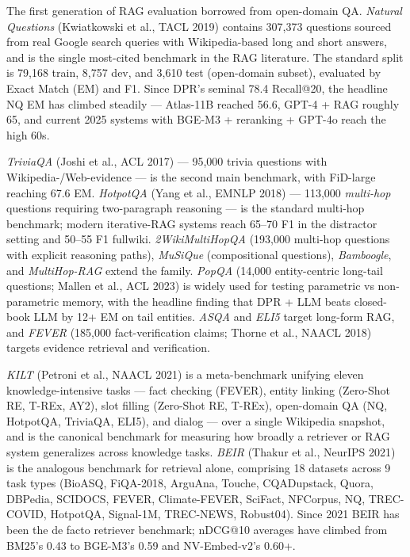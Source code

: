 The first generation of RAG evaluation borrowed from open-domain QA. \emph{Natural Questions} (Kwiatkowski et al., TACL 2019) contains 307,373 questions sourced from real Google search queries with Wikipedia-based long and short answers, and is the single most-cited benchmark in the RAG literature. The standard split is 79,168 train, 8,757 dev, and 3,610 test (open-domain subset), evaluated by Exact Match (EM) and F1. Since DPR's seminal 78.4 Recall@20, the headline NQ EM has climbed steadily --- Atlas-11B reached 56.6, GPT-4 + RAG roughly 65, and current 2025 systems with BGE-M3 + reranking + GPT-4o reach the high 60s.

\emph{TriviaQA} (Joshi et al., ACL 2017) --- 95,000 trivia questions with Wikipedia-/Web-evidence --- is the second main benchmark, with FiD-large reaching 67.6 EM. \emph{HotpotQA} (Yang et al., EMNLP 2018) --- 113,000 \emph{multi-hop} questions requiring two-paragraph reasoning --- is the standard multi-hop benchmark; modern iterative-RAG systems reach 65--70 F1 in the distractor setting and 50--55 F1 fullwiki. \emph{2WikiMultiHopQA} (193,000 multi-hop questions with explicit reasoning paths), \emph{MuSiQue} (compositional questions), \emph{Bamboogle}, and \emph{MultiHop-RAG} extend the family. \emph{PopQA} (14,000 entity-centric long-tail questions; Mallen et al., ACL 2023) is widely used for testing parametric vs non-parametric memory, with the headline finding that DPR + LLM beats closed-book LLM by 12+ EM on tail entities. \emph{ASQA} and \emph{ELI5} target long-form RAG, and \emph{FEVER} (185,000 fact-verification claims; Thorne et al., NAACL 2018) targets evidence retrieval and verification.

\emph{KILT} (Petroni et al., NAACL 2021) is a meta-benchmark unifying eleven knowledge-intensive tasks --- fact checking (FEVER), entity linking (Zero-Shot RE, T-REx, AY2), slot filling (Zero-Shot RE, T-REx), open-domain QA (NQ, HotpotQA, TriviaQA, ELI5), and dialog --- over a single Wikipedia snapshot, and is the canonical benchmark for measuring how broadly a retriever or RAG system generalizes across knowledge tasks. \emph{BEIR} (Thakur et al., NeurIPS 2021) is the analogous benchmark for retrieval alone, comprising 18 datasets across 9 task types (BioASQ, FiQA-2018, ArguAna, Touche, CQADupstack, Quora, DBPedia, SCIDOCS, FEVER, Climate-FEVER, SciFact, NFCorpus, NQ, TREC-COVID, HotpotQA, Signal-1M, TREC-NEWS, Robust04). Since 2021 BEIR has been the de facto retriever benchmark; nDCG@10 averages have climbed from BM25's 0.43 to BGE-M3's 0.59 and NV-Embed-v2's 0.60+.

